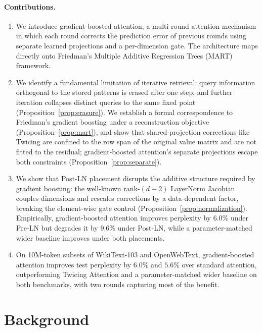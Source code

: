 \documentclass{article}
\theoremstyle{definition}
\begin{document}
\paragraph{Contributions.}
\begin{enumerate}
    \item We introduce gradient-boosted attention, a multi-round attention mechanism in which each round corrects the prediction error of previous rounds using separate learned projections and a per-dimension gate. The architecture maps directly onto Friedman's Multiple Additive Regression Trees (MART) framework.

    \item We identify a fundamental limitation of iterative retrieval: query information orthogonal to the stored patterns is erased after one step, and further iteration collapses distinct queries to the same fixed point (Proposition~\ref{prop:erasure}). We establish a formal correspondence to Friedman's gradient boosting under a reconstruction objective (Proposition~\ref{prop:mart}), and show that shared-projection corrections like Twicing are confined to the row span of the original value matrix and are not fitted to the residual; gradient-boosted attention's separate projections escape both constraints (Proposition~\ref{prop:separate}).

    \item We show that Post-LN placement disrupts the additive structure required by gradient boosting: the well-known rank-$(d{-}2)$ LayerNorm Jacobian \citep{xiong2020layer} couples dimensions and rescales corrections by a data-dependent factor, breaking the element-wise gate control (Proposition~\ref{prop:normalization}). Empirically, gradient-boosted attention improves perplexity by $6.0\%$ under Pre-LN but degrades it by $9.6\%$ under Post-LN, while a parameter-matched wider baseline improves under both placements.

    \item On 10M-token subsets of WikiText-103 and OpenWebText, gradient-boosted attention improves test perplexity by $6.0\%$ and $5.6\%$ over standard attention, outperforming Twicing Attention and a parameter-matched wider baseline on both benchmarks, with two rounds capturing most of the benefit.
\end{enumerate}


\section{Background}
\label{sec:background}
\end{document}

